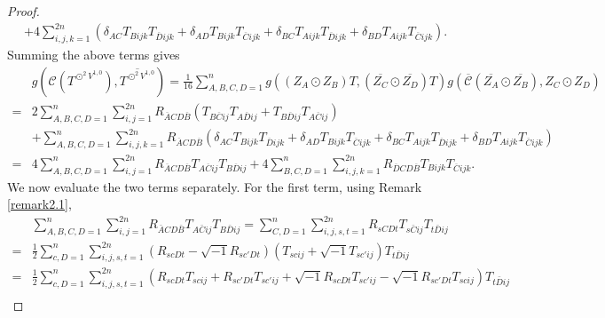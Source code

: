 \documentclass{amsart}
\theoremstyle{definition}
\theoremstyle{remark}
\numberwithin{equation}{section}
\begin{document}
\begin{proof}
\begin{align*}
 &+ 4\sum\limits_{i,j,k = 1}^{2n} {\left( {{\delta _{AC}}{T_{Bijk}}{T_{\overline D ijk}} + {\delta _{AD}}{T_{Bijk}}{T_{\overline C ijk}} + {\delta _{BC}}{T_{Aijk}}{T_{\overline D ijk}} + {\delta _{BD}}{T_{Aijk}}{T_{\overline C ijk}}} \right)} .
\end{align*}
Summing the above terms gives
\begin{align*}
&g\left( {{\mathcal{C} }\left( {{T^{{ \odot ^2}{V^{1,0}}}}} \right),\overline {{T^{{ \odot ^2}{V^{1,0}}}}} } \right)
= \frac{1}{16}\sum\limits_{A,B,C,D=1}^{n} {g\left( {\left( {{Z_A} \odot {Z_B}} \right)T,\left( {\overline {{Z_C}}  \odot \overline {{Z_D}} } \right)T} \right) {g\left( {\overline {\mathcal{C}} \left( {\overline {{Z_A}}  \odot \overline {{Z_B}} } \right),{Z_C} \odot {Z_D}} \right)}} \\
 =& 2\sum\limits_{A,B,C,D=1}^{n} {\sum\limits_{i,j=1}^{2n} {{R_{\overline A C  D \overline B}}\left(  {{T_{B\overline C ij}}{T_{A\overline D ij}} + {T_{B\overline D ij}}{T_{A\overline C ij}}  } \right)} }  \\
 &+\sum\limits_{A,B,C,D=1}^{n} {\sum\limits_{i,j,k=1}^{2n} {{R_{\overline A C  D \overline B}}\left( {{\delta _{AC}}{T_{Bijk}}{T_{\overline D ijk}} + {\delta _{AD}}{T_{Bijk}}{T_{\overline C ijk}} + {\delta _{BC}}{T_{Aijk}}{T_{\overline D ijk}} + {\delta _{BD}}{T_{Aijk}}{T_{\overline C ijk}}} \right)} } \\
 =& 4\sum\limits_{A,B,C,D=1}^{n} {\sum\limits_{i,j=1}^{2n} {{R_{\overline A C  D \overline B}} {{T_{A\overline C ij}}{T_{B\overline D ij}} } } } + 4\sum\limits_{B,C,D=1}^{n} {\sum\limits_{i,j,k=1}^{2n} { {  {R_{\overline D C  D \overline B}}{T_{Bijk}}{T_{\overline C ijk}}} } } .
\end{align*}
We now evaluate the two terms separately. For the first term, using Remark \ref{remark2.1},
\begin{align*}
 & \sum\limits_{A,B,C,D = 1}^n {\sum\limits_{i,j = 1}^{2n} {{R_{\bar ACD\bar B}}{T_{A\bar Cij}}{T_{B\bar Dij}}} }  = \sum\limits_{C,D = 1}^n {\sum\limits_{i,j,s,t = 1}^{2n} {{R_{sCDt}}{T_{s\bar Cij}}{T_{t\bar Dij}}} }\\
   =& \frac{1}{2} \sum\limits_{c,D = 1}^n {\sum\limits_{i,j,s,t = 1}^{2n} {\left( {{R_{scDt}} - \sqrt { - 1} {R_{sc'Dt}}} \right)\left( {{T_{scij}} + \sqrt { - 1} {T_{sc'ij}}} \right){T_{t\bar Dij}}} } \\
       =& \frac{1}{2} \sum\limits_{c,D = 1}^n {\sum\limits_{i,j,s,t = 1}^{2n} {\left( {{R_{scDt}}{T_{scij}} + {R_{sc'Dt}}{T_{sc'ij}} + \sqrt { - 1} {R_{scDt}}{T_{sc'ij}} - \sqrt { - 1} {R_{sc'Dt}}{T_{scij}}} \right){T_{t\bar Dij}}} } \\

\end{align*}
\end{proof}
\end{document}
